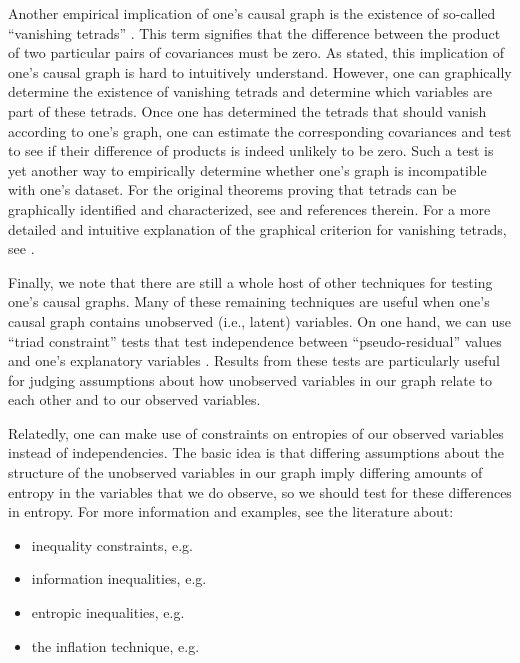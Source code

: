 Another empirical implication of one's causal graph is the existence of so-called ``vanishing tetrads'' \citep{spearman_1904_general}.
This term signifies that the difference between the product of two particular pairs of covariances must be zero.
As stated, this implication of one's causal graph is hard to intuitively understand.
However, one can graphically determine the existence of vanishing tetrads and determine which variables are part of these tetrads.
Once one has determined the tetrads that should vanish according to one's graph, one can estimate the corresponding covariances and test to see if their difference of products is indeed unlikely to be zero.
Such a test is yet another way to empirically determine whether one's graph is incompatible with one's dataset.
For the original theorems proving that tetrads can be graphically identified and characterized, see \citet{shafer_1996_vanishing} and references therein.
For a more detailed and intuitive explanation of the graphical criterion for vanishing tetrads, see \citet{thoemmes_2018_local}.

Finally, we note that there are still a whole host of other techniques for testing one's causal graphs.
Many of these remaining techniques are useful when one's causal graph contains unobserved (i.e., latent) variables.
On one hand, we can use ``triad constraint'' tests that test independence between ``pseudo-residual'' values and one's explanatory variables \citep{cai_2019_triad}.
Results from these tests are particularly useful for judging assumptions about how unobserved variables in our graph relate to each other and to our observed variables.

Relatedly, one can make use of constraints on entropies of our observed variables instead of independencies.
The basic idea is that differing assumptions about the structure of the unobserved variables in our graph imply differing amounts of entropy in the variables that we do observe, so we should test for these differences in entropy.
For more information and examples, see the literature about:
\begin{itemize}
  \item inequality constraints, e.g. \citet{tian_2002_testable, kang_2006_inequality, ver_2011_sequence}
  \item information inequalities, e.g. \citet{chaves_2014_inferring}
  \item entropic inequalities, e.g. \citet{chaves_2014_causal}
  \item the inflation technique, e.g. \citet{wolfe_2019_inflation, navascues_2020_inflation}
\end{itemize}
